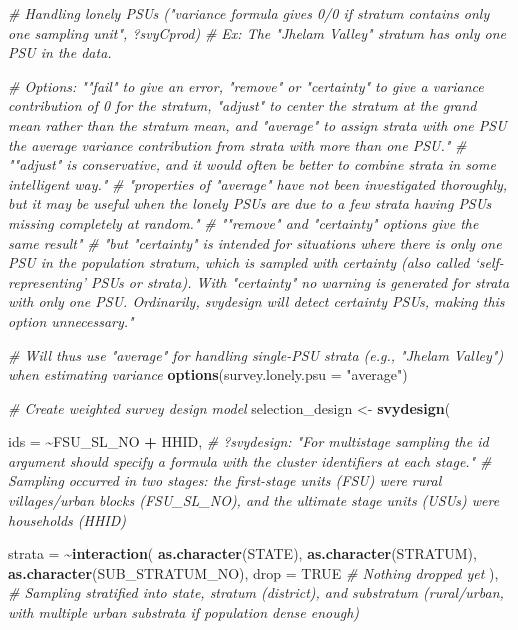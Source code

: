 \documentclass[
]{article}
\newenvironment{Shaded}{\begin{snugshade}}{\end{snugshade}}
\newcommand{\AttributeTok}[1]{\textcolor[rgb]{0.13,0.29,0.53}{#1}}
\newcommand{\CommentTok}[1]{\textcolor[rgb]{0.56,0.35,0.01}{\textit{#1}}}
\newcommand{\ConstantTok}[1]{\textcolor[rgb]{0.56,0.35,0.01}{#1}}
\newcommand{\FunctionTok}[1]{\textcolor[rgb]{0.13,0.29,0.53}{\textbf{#1}}}
\newcommand{\NormalTok}[1]{#1}
\newcommand{\OtherTok}[1]{\textcolor[rgb]{0.56,0.35,0.01}{#1}}
\newcommand{\SpecialCharTok}[1]{\textcolor[rgb]{0.81,0.36,0.00}{\textbf{#1}}}
\newcommand{\StringTok}[1]{\textcolor[rgb]{0.31,0.60,0.02}{#1}}
\begin{document}
\begin{Shaded}
\begin{Highlighting}[]
\CommentTok{\# Handling lonely PSUs ("variance formula  gives 0/0 if stratum contains only one sampling unit", \textasciigrave{}?svyCprod\textasciigrave{})}
\CommentTok{\# Ex: The "Jhelam Valley" stratum has only one PSU in the data.}

\CommentTok{\# Options: ""fail" to give an error, "remove" or "certainty" to give a variance contribution of 0 for the stratum, "adjust" to center the stratum at the grand mean rather than the stratum mean, and "average" to assign strata with one PSU the average variance contribution from strata with more than one PSU."}
\CommentTok{\# ""adjust" is conservative, and it would often be better to combine strata in some intelligent way."}
\CommentTok{\# "properties of "average" have not been investigated thoroughly, but it may be useful when the lonely PSUs are due to a few strata having PSUs missing completely at random."}
\CommentTok{\# ""remove" and "certainty" options give the same result" }
\CommentTok{\# "but "certainty" is intended for situations where there is only one PSU in the population stratum, which is sampled with certainty (also called ‘self{-}representing’ PSUs or strata). With "certainty" no warning is generated for strata with only one PSU. Ordinarily, svydesign will detect certainty PSUs, making this option unnecessary."}

\CommentTok{\# Will thus use "average" for handling single{-}PSU strata (e.g., "Jhelam Valley") when estimating variance}
\FunctionTok{options}\NormalTok{(}\AttributeTok{survey.lonely.psu =} \StringTok{"average"}\NormalTok{)}

\CommentTok{\# Create weighted survey design model}
\NormalTok{selection\_design }\OtherTok{\textless{}{-}} \FunctionTok{svydesign}\NormalTok{(}
  
  \AttributeTok{ids =} \SpecialCharTok{\textasciitilde{}}\NormalTok{FSU\_SL\_NO }\SpecialCharTok{+}\NormalTok{ HHID, }
  \CommentTok{\# \textasciigrave{}?svydesign\textasciigrave{}: "For multistage sampling the id argument should specify a formula with the cluster identifiers at each stage."}
  \CommentTok{\# Sampling occurred in two stages: the first{-}stage units (FSU) were rural villages/urban blocks (FSU\_SL\_NO), and the ultimate stage units (USUs) were households (HHID)}
  
  \AttributeTok{strata =} \SpecialCharTok{\textasciitilde{}}\FunctionTok{interaction}\NormalTok{(}
    \FunctionTok{as.character}\NormalTok{(STATE),}
    \FunctionTok{as.character}\NormalTok{(STRATUM),}
    \FunctionTok{as.character}\NormalTok{(SUB\_STRATUM\_NO),}
    \AttributeTok{drop =} \ConstantTok{TRUE} \CommentTok{\# Nothing dropped yet}
\NormalTok{    ), }
  \CommentTok{\# Sampling stratified into state, stratum (district), and substratum (rural/urban, with multiple urban substrata if population dense enough)}


\end{Highlighting}
\end{Shaded}
\end{document}
